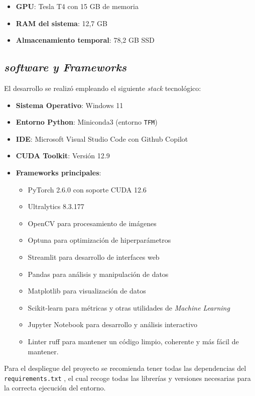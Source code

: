 \documentclass[12pt,a4paper,onecolumn,oneside]{report}
\begin{document}
\begin{itemize}
    \item \textbf{GPU}: Tesla T4 con 15 GB de memoria
    \item \textbf{RAM del sistema}: 12,7 GB
    \item \textbf{Almacenamiento temporal}: 78,2 GB SSD
\end{itemize}

\subsection{\textit{software y Frameworks}}

El desarrollo se realizó empleando el siguiente \textit{stack} tecnológico:

\begin{itemize}
    \item \textbf{Sistema Operativo}: Windows 11
    \item \textbf{Entorno Python}: Miniconda3 (entorno \texttt{TFM})
    \item \textbf{IDE}: Microsoft Visual Studio Code con Github Copilot
    \item \textbf{CUDA Toolkit}: Versión 12.9
    \item \textbf{Frameworks principales}:
    \begin{itemize}
        \item PyTorch 2.6.0 con soporte CUDA 12.6
        \item Ultralytics 8.3.177
        \item OpenCV para procesamiento de imágenes
        \item Optuna para optimización de hiperparámetros 
        \item Streamlit para desarrollo de interfaces web
        \item Pandas para análisis y manipulación de datos
        \item Matplotlib para visualización de datos 
        \item Scikit-learn para métricas y otras utilidades de \textit{Machine Learning}
        \item Jupyter Notebook para desarrollo y análisis interactivo
        \item Linter ruff para mantener un código limpio, coherente y más fácil de mantener.
    \end{itemize}
\end{itemize}

Para el despliegue del proyecto se recomienda tener todas las dependencias del \texttt{requirements.txt} \cite{repoTFM}, el cual 
recoge todas las librerías y versiones necesarias para la correcta ejecución del entorno.
\end{document}
